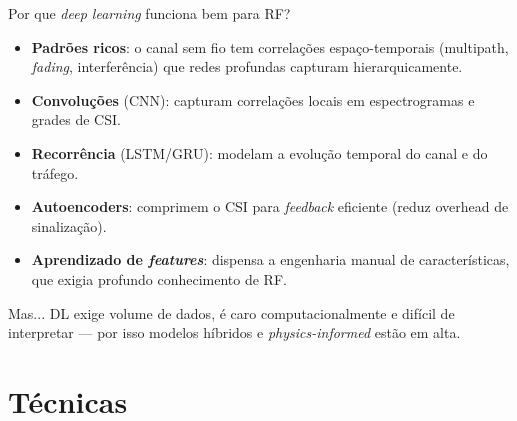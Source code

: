 \documentclass[aspectratio=169,11pt]{beamer}
\begin{document}
\begin{frame}{Por que \emph{deep learning} funciona bem para RF?}
  \begin{itemize}
    \item \textbf{Padrões ricos}: o canal sem fio tem correlações espaço-temporais (multipath, \emph{fading}, interferência) que redes profundas capturam hierarquicamente.
    \item \textbf{Convoluções} (CNN): capturam correlações locais em espectrogramas e grades de CSI.
    \item \textbf{Recorrência} (LSTM/GRU): modelam a evolução temporal do canal e do tráfego.
    \item \textbf{Autoencoders}: comprimem o CSI para \emph{feedback} eficiente (reduz overhead de sinalização).
    \item \textbf{Aprendizado de \emph{features}}: dispensa a engenharia manual de características, que exigia profundo conhecimento de RF.
  \end{itemize}
  \begin{block}{Mas...}
    DL exige volume de dados, é caro computacionalmente e difícil de interpretar --- por isso modelos híbridos e \emph{physics-informed} estão em alta.
  \end{block}
\end{frame}

\section{Técnicas}
\end{document}
